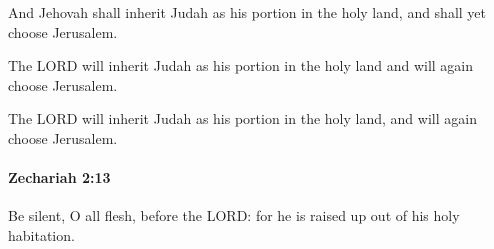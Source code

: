 			\begin{versebox}
					\item[BHS] 
					\item[LXX] 
					\item[ASV] And Jehovah shall inherit Judah as his portion in the holy land, and shall yet choose Jerusalem.
					\item[NIV] The LORD will inherit Judah as his portion in the holy land and will again choose Jerusalem.
					\item[NRSV] The LORD will inherit Judah as his portion in the holy land, and will again choose Jerusalem.
			\end{versebox}

		\paragraph{Zechariah 2:13} %
			\label{ZECHARIAH-2-13}

			Be silent, O all flesh, before the LORD: for he is raised up out of his holy habitation.

